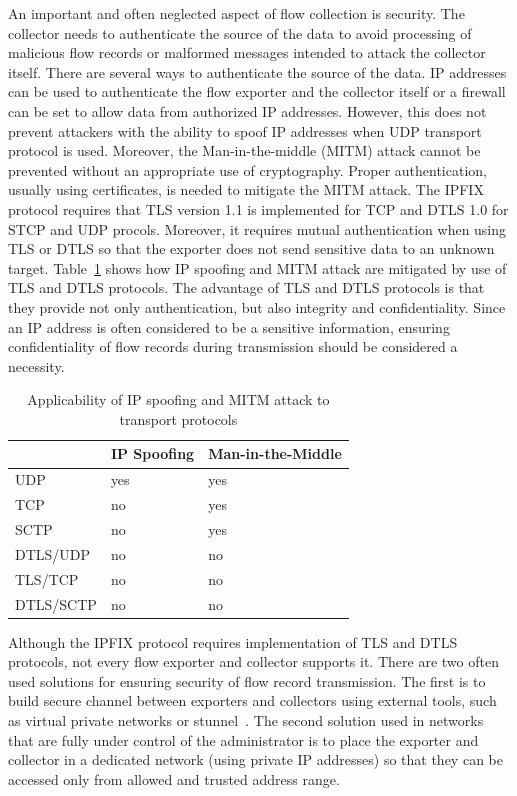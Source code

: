 An important and often neglected aspect of flow collection is security. The collector needs to authenticate the source of the data to avoid processing of malicious flow records or malformed messages intended to attack the collector itself. There are several ways to authenticate the source of the data. IP addresses can be used to authenticate the flow exporter and the collector itself or a firewall can be set to allow data from authorized IP addresses. However, this does not prevent attackers with the ability to spoof IP addresses when UDP transport protocol is used. Moreover, the Man-in-the-middle (MITM) attack cannot be prevented without an appropriate use of cryptography. Proper authentication, usually using certificates, is needed to mitigate the MITM attack. The IPFIX protocol requires that TLS version 1.1 is implemented for TCP and DTLS 1.0 for STCP and UDP procols. Moreover, it requires mutual authentication when using TLS or DTLS so that the exporter does not send sensitive data to an unknown target. Table~\ref{tab:flow.protocols.security} shows how IP spoofing and MITM attack are mitigated by use of TLS and DTLS protocols. The advantage of TLS and DTLS protocols is that they provide not only authentication, but also integrity and confidentiality. Since an IP address is often considered to be a sensitive information, ensuring confidentiality of flow records during transmission should be considered a necessity.

\begin{table}[t!]
	\centering
	\begin{tabular}{lll}
	\toprule
			& \textbf{IP Spoofing}	& \textbf{Man-in-the-Middle}  \\ \midrule
	UDP		& yes			& yes \\ 
	TCP		& no			& yes \\ 
	SCTP		& no			& yes \\
	DTLS/UDP	& no			& no  \\
	TLS/TCP		& no			& no  \\ 
	DTLS/SCTP	& no			& no  \\ \bottomrule
	\end{tabular}
	\caption{Applicability of IP spoofing and MITM attack to transport protocols}
	\label{tab:flow.protocols.security}
\end{table}

Although the IPFIX protocol requires implementation of TLS and DTLS protocols, not every flow exporter and collector supports it. There are two often used solutions for ensuring security of flow record transmission. The first is to build secure channel between exporters and collectors using external tools, such as virtual private networks or stunnel~\cite{Trojnar-2015-Stunnel}. The second solution used in networks that are fully under control of the administrator is to place the exporter and collector in a dedicated network (using private IP addresses) so that they can be accessed only from allowed and trusted address range.


